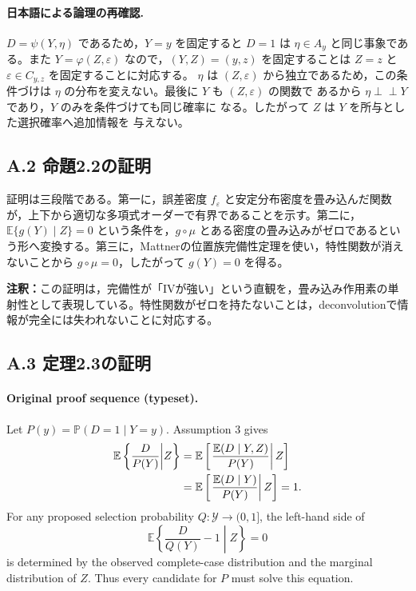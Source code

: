 \documentclass[10pt,a4paper]{article}
\newcommand{\indep}{\mathrel{\perp\!\!\!\perp}}
\newcommand{\E}{\mathbb{E}}
\newcommand{\Prb}{\mathbb{P}}
\newcommand{\note}[1]{\par\smallskip\noindent\textbf{注釈：}#1\par\smallskip}
\begin{document}
\paragraph{日本語による論理の再確認.}
$D=\psi(Y,\eta)$ であるため，$Y=y$ を固定すると $D=1$ は
$\eta\in A_y$ と同じ事象である。また $Y=\varphi(Z,\varepsilon)$
なので，$(Y,Z)=(y,z)$ を固定することは $Z=z$ と
$\varepsilon\in C_{y,z}$ を固定することに対応する。
$\eta$ は $(Z,\varepsilon)$ から独立であるため，この条件づけは
$\eta$ の分布を変えない。最後に $Y$ も $(Z,\varepsilon)$ の関数で
あるから $\eta\indep Y$ であり，$Y$ のみを条件づけても同じ確率に
なる。したがって $Z$ は $Y$ を所与とした選択確率へ追加情報を
与えない。

\subsection*{A.2 命題2.2の証明}

証明は三段階である。第一に，誤差密度 $f_\varepsilon$ と安定分布密度を畳み込んだ関数が，上下から適切な多項式オーダーで有界であることを示す。第二に，$\E\{g(Y)\mid Z\}=0$ という条件を，$g\circ\mu$ とある密度の畳み込みがゼロであるという形へ変換する。第三に，Mattnerの位置族完備性定理を使い，特性関数が消えないことから $g\circ\mu=0$，したがって $g(Y)=0$ を得る。

\note{この証明は，完備性が「IVが強い」という直観を，畳み込み作用素の単射性として表現している。特性関数がゼロを持たないことは，deconvolutionで情報が完全には失われないことに対応する。}

\subsection*{A.3 定理2.3の証明}

\paragraph{Original proof sequence (typeset).}
Let $P(y)=\Prb(D=1\mid Y=y)$. Assumption 3 gives
\begin{align}
 \E\left\{\frac{D}{P(Y)}\middle|Z\right\}
 &=\E\left[\left.
   \frac{\E(D\mid Y,Z)}{P(Y)}\right|Z\right] \notag\\
 &=\E\left[\left.
   \frac{\E(D\mid Y)}{P(Y)}\right|Z\right]
 =1.
 \label{eq:annotated-a7}
\end{align}
For any proposed selection probability $Q:\mathcal Y\to(0,1]$,
the left-hand side of
\[
 \E\left\{\frac{D}{Q(Y)}-1\middle|Z\right\}=0
\]
is determined by the observed complete-case distribution and the
marginal distribution of $Z$. Thus every candidate for $P$ must solve
this equation.
\end{document}
